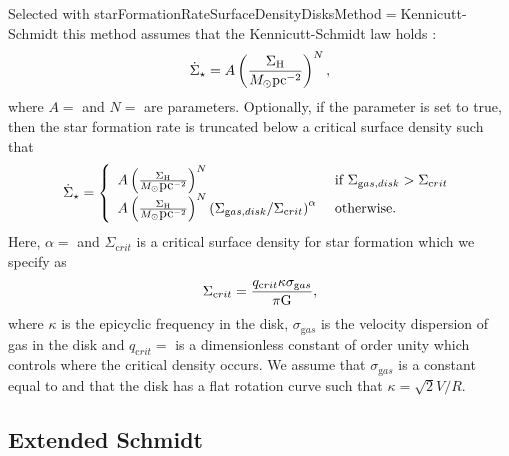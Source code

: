 Selected with {\normalfont \ttfamily starFormationRateSurfaceDensityDisksMethod}$=${\normalfont \ttfamily Kennicutt-Schmidt} this method assumes that the Kennicutt-Schmidt law holds \citep{schmidt_rate_1959,kennicutt_global_1998}:
\begin{equation}
\dot{\Sigma}_\star = A \left({\Sigma_{\mathrm H} \over M_\odot \hbox{pc}^{-2}} \right)^N,
\end{equation}
where $A=${\normalfont \ttfamily [starFormationKennicuttSchmidtNormalization]} and $N=${\normalfont \ttfamily [starFormationKennicuttSchmidtExponent]} are parameters. Optionally, if the {\normalfont \ttfamily [starFormationKennicuttSchmidtTruncate]} parameter is set to true, then the star formation rate is truncated below a critical surface density such that
\begin{equation}
\dot{\Sigma}_\star = \left\{ \begin{array}{ll} A \left({\Sigma_{\mathrm H} \over M_\odot \hbox{pc}^{-2}} \right)^N & \hbox{ if } \Sigma_{\mathrm gas,disk} > \Sigma_{\mathrm crit} \\ A \left({\Sigma_{\mathrm H} \over M_\odot \hbox{pc}^{-2}} \right)^N \left(\Sigma_{\mathrm gas,disk}/\Sigma_{\mathrm crit}\right)^\alpha & \hbox{ otherwise.} \end{array} \right.
\end{equation}
Here, $\alpha=${\normalfont \ttfamily [starFormationKennicuttSchmidtExponentTruncated]} and $\Sigma_{\mathrm crit}$ is a critical surface density for star formation which we specify as
\begin{equation}
\Sigma_{\mathrm crit} = {q_{\mathrm crit} \kappa \sigma_{\mathrm gas} \over \pi \G},
\end{equation}
where $\kappa$ is the epicyclic frequency in the disk, $\sigma_{\mathrm gas}$ is the velocity dispersion of gas in the disk and $q_{\mathrm crit}=${\normalfont \ttfamily [toomreParameterCritical]} is a dimensionless constant of order unity which controls where the critical density occurs. We assume that $\sigma_{\mathrm gas}$ is a constant equal to {\normalfont \ttfamily [velocityDispersionDiskGas]} and that the disk has a flat rotation curve such that $\kappa = \sqrt{2} V/R$.

\subsection{Extended Schmidt}\label{sec:StarFormationExtendedSchmidt}

